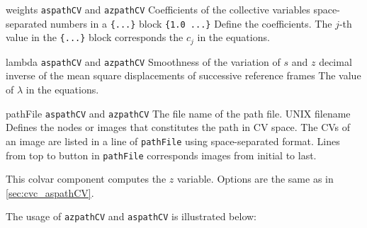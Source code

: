 \begin{cvcoptions}
\item %
  \keydef
    {weights}{%
    \texttt{aspathCV} and \texttt{azpathCV}}{%
    Coefficients of the collective variables}{%
    space-separated numbers in a \texttt{\{...\}} block}{%
    \texttt{\{1.0 ...\}}}{%
    Define the coefficients. The $j$-th value in the \texttt{\{...\}} block corresponds the $c_{j}$ in the equations.
  }

\item %
  \keydef
    {lambda}{%
    \texttt{aspathCV} and \texttt{azpathCV}}{%
    Smoothness of the variation of $s$ and $z$}{%
    decimal}{%
    inverse of the mean square displacements of successive reference frames}{%
    The value of $\lambda$ in the equations.
  }

\item %
  \key
    {pathFile}{%
    \texttt{aspathCV} and \texttt{azpathCV}}{%
    The file name of the path file.}{%
    UNIX filename}{%
		Defines the nodes or images that constitutes the path in CV space. The CVs of an image are listed in a line of \texttt{pathFile} using space-separated format. Lines from top to button in \texttt{pathFile} corresponds images from initial to last.
    }

\end{cvcoptions}


This colvar component computes the $z$ variable. Options are the same as in \ref{sec:cvc_aspathCV}.

The usage of \texttt{azpathCV} and \texttt{aspathCV} is illustrated below:

